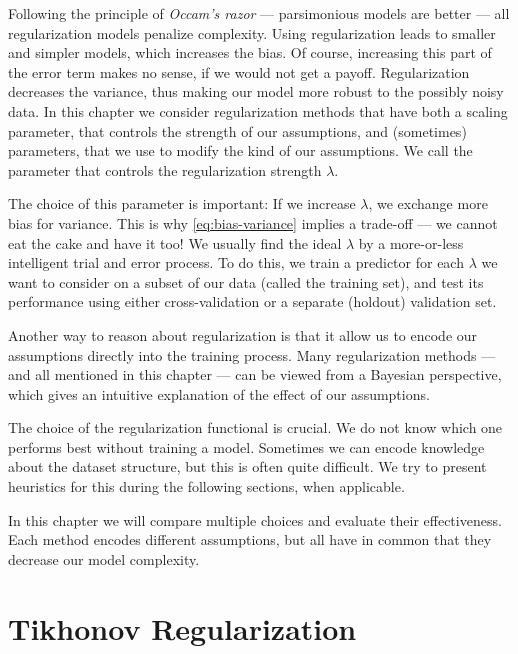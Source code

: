 Following the principle of \emph{Occam's razor} --- parsimonious models are better --- all regularization models penalize complexity.
Using regularization leads to smaller and simpler models, which increases the bias.
Of course, increasing this part of the error term makes no sense, if we would not get a payoff.
Regularization decreases the variance, thus making our model more robust to the possibly noisy data.
In this chapter we consider regularization methods that have both a scaling parameter, that controls the strength of our assumptions, and (sometimes) parameters, that we use to modify the kind of our assumptions.
We call the parameter that controls the regularization strength \(\lambda\).

The choice of this parameter is important:
If we increase \(\lambda\), we exchange more bias for variance.
This is why \cref{eq:bias-variance} implies a trade-off --- we cannot eat the cake and have it too!
We usually find the ideal \(\lambda\) by a more-or-less intelligent trial and error process.
To do this, we train a predictor for each \(\lambda\) we want to consider on a subset of our data (called the training set), and test its performance using either cross-validation or a separate (holdout) validation set. 

Another way to reason about regularization is that it allow us to encode our
assumptions directly into the training process.
Many regularization methods --- and all mentioned in this chapter --- can be
viewed from a Bayesian perspective, which gives an intuitive explanation of the
effect of our assumptions.

The choice of the regularization functional is crucial.
We do not know which one performs best without training a model.
Sometimes we can encode knowledge about the dataset structure, but this is often
quite difficult.
We try to present heuristics for this during the following sections, when applicable.

In this chapter we will compare multiple choices and evaluate their effectiveness.
Each method encodes different assumptions, but all have in common that they decrease
our model complexity.

\section{Tikhonov Regularization}
